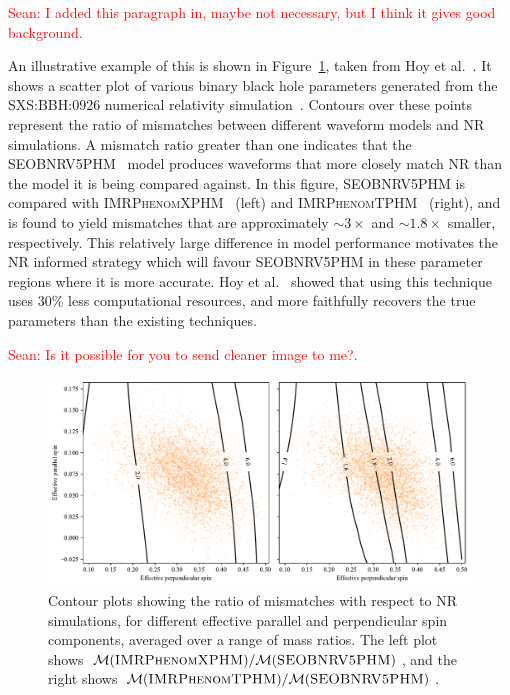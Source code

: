 \documentclass{ucdgradtaughtthesis}
\newcommand{\Sean}[1]{{\textcolor{red}{{Sean: #1}} }}
\begin{document}
\Sean{I added this paragraph in, maybe not necessary, but I think it gives good background.}

%
An illustrative example of this is shown in Figure~\ref{fig:projectmotivation}, taken from Hoy et al.~\cite{Ogpaper}. It shows a scatter plot of various binary black hole parameters generated from the \textsc{SXS:BBH:0926} numerical relativity simulation~\cite{NRsimulation}. 
Contours over these points represent the ratio of mismatches between different waveform models and NR simulations.
A mismatch ratio greater than one indicates that the \textsc{SEOBNRV5PHM}~\cite{bestNRfitS} model produces waveforms that more closely match NR than the model it is being compared against.
In this figure, \textsc{SEOBNRV5PHM} is compared with \textsc{IMRPhenomXPHM}~\cite{NRfitMP} (left) and \textsc{IMRPhenomTPHM}~\cite{NRfitMT} (right), 
and is found to yield mismatches that are approximately \( \sim 3\times \) and \( \sim 1.8\times \) smaller, respectively.
This relatively large difference in model performance motivates the NR informed strategy
which will favour \textsc{SEOBNRV5PHM} in these parameter regions where it is more accurate. 
Hoy et al.~\cite{Ogpaper} showed that using this technique uses 30\% less computational resources, and more faithfully recovers the true parameters than
the existing techniques.
%

\Sean{Is it possible for you to send cleaner image to me?.}
\begin{figure}[H]
    \centering
    \includegraphics[width=\textwidth]{LatexPlots/HoyFigure2.pdf}
    \caption[Motivating the NR Bayesian Method.]{Contour plots showing the ratio of mismatches with respect to NR simulations, for different effective parallel and perpendicular spin components, averaged over a range of mass ratios. 
    The left plot shows \( \mathcal{M}(\textsc{IMRPhenomXPHM}) / \mathcal{M}(\textsc{SEOBNRV5PHM}) \), and the right shows \( \mathcal{M}(\textsc{IMRPhenomTPHM}) / \mathcal{M}(\textsc{SEOBNRV5PHM}) \).}
    \label{fig:projectmotivation}
\end{figure}
\end{document}
